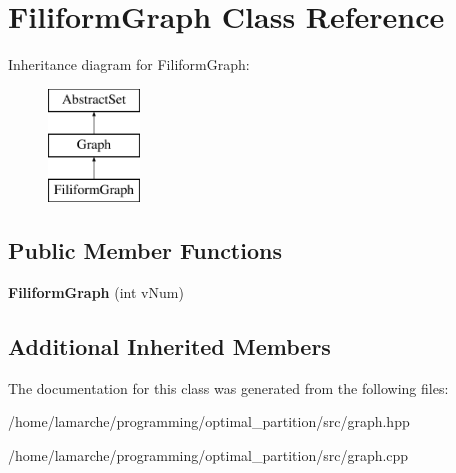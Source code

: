 \hypertarget{classFiliformGraph}{\section{Filiform\-Graph Class Reference}
\label{classFiliformGraph}
}
Inheritance diagram for Filiform\-Graph\-:\begin{figure}[H]
\begin{center}
\leavevmode
\includegraphics[height=3.000000cm]{classFiliformGraph}
\end{center}
\end{figure}
\subsection*{Public Member Functions}
\begin{DoxyCompactItemize}
\item 
\hypertarget{classFiliformGraph_a78e5ddfddf9f546254cb9430bb1aaccf}{{\bfseries Filiform\-Graph} (int v\-Num)}\label{classFiliformGraph_a78e5ddfddf9f546254cb9430bb1aaccf}

\end{DoxyCompactItemize}
\subsection*{Additional Inherited Members}


The documentation for this class was generated from the following files\-:\begin{DoxyCompactItemize}
\item 
/home/lamarche/programming/optimal\-\_\-partition/src/graph.\-hpp\item 
/home/lamarche/programming/optimal\-\_\-partition/src/graph.\-cpp\end{DoxyCompactItemize}
